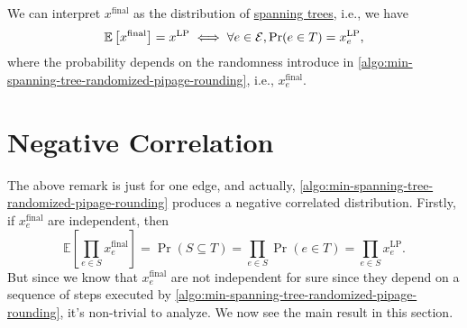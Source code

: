 \begin{remark}
	We can interpret \(x^{\text{final} }\) as the distribution of \hyperref[def:spanning-tree]{spanning trees}, i.e., we have
	\[
		\mathbb{E}\left[x^{\text{final} } \right] = x^{\text{LP} } \iff \forall e\in \mathcal{\MakeUppercase{e}}, \Pr(e\in T) = x_e^{\text{LP} },
	\]
	where the probability depends on the randomness introduce in \autoref{algo:min-spanning-tree-randomized-pipage-rounding}, i.e., \(x_e^{\text{final} } \).
\end{remark}

\section{Negative Correlation}
The above remark is just for one edge, and actually, \autoref{algo:min-spanning-tree-randomized-pipage-rounding} produces a negative correlated distribution. Firstly, if \(x_e^{\text{final} } \) are independent, then
\[
	\mathbb{E}\left[\prod_{e\in S} x^{\text{final} }_e \right] = \Pr(S \subseteq T) = \prod_{e\in S} \Pr(e\in T) = \prod_{e\in S} x^{\text{LP} }_e.
\]
But since we know that \(x_e^{\text{final} }\) are not independent for sure since they depend on a sequence of steps executed by \autoref{algo:min-spanning-tree-randomized-pipage-rounding}, it's non-trivial to analyze. We now see the main result in this section.

